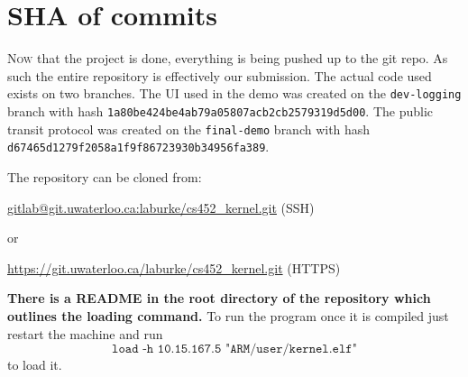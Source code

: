 \documentclass{amsart} \usepackage{amsmath} \usepackage{upgreek}
\begin{document}
\section*{SHA of commits}

\textsc{Now} that the project is done, everything is being pushed up to the git
repo. As such the entire repository is effectively our submission. The actual
code used exists on two branches. The UI used in the demo was created on the
\texttt{dev-logging} branch with hash
\texttt{1a80be424be4ab79a05807acb2cb2579319d5d00}. The public transit protocol
was created on the \texttt{final-demo} branch with hash
\texttt{d67465d1279f2058a1f9f86723930b34956fa389}.

\noindent The repository can be cloned from:

\url{gitlab@git.uwaterloo.ca:laburke/cs452_kernel.git} (SSH)

or

\url{https://git.uwaterloo.ca/laburke/cs452_kernel.git} (HTTPS)

\textbf{There is a README in the root directory of the repository which outlines
the loading command.} To run the program once it is compiled just restart the
machine and run \[\texttt{load -h 10.15.167.5 "ARM/user/kernel.elf"}\] to load
it.
\end{document}
